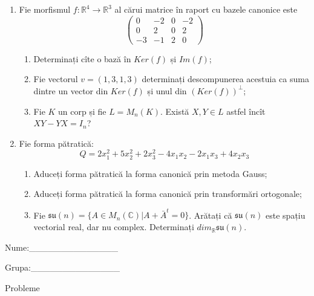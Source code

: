 \documentclass{article}
\begin{document}
\begin{enumerate}
 \item Fie morfismul $f:\mathbb{R}^4 \to \mathbb{R}^3$ al cărui matrice în raport cu bazele canonice este
$$\begin{pmatrix}
0&-2&0&-2\\
0&2&0&2\\
-3&-1&2&0
\end{pmatrix}$$

\begin{enumerate}
\item Determinați cîte o bază în $Ker(f)$ și $Im(f)$;
\item Fie vectorul $v=(1,3,1,3)$ determinați descompunerea acestuia ca suma dintre un vector din $Ker(f)$ și unul din $(Ker(f))^\perp$;
\item Fie $K$ un corp și fie $L=M_n(K)$. Există $X,Y \in L$ astfel încît $XY-YX=I_n$?  
\end{enumerate}
\item Fie forma pătratică:
$$Q= 2x_1^2+5x_2^2+2x_3^2-4x_1x_2-2x_1x_3+4x_2x_3$$

\begin{enumerate}
\item Aduceți forma pătratică la forma canonică prin metoda Gauss;
\item Aduceți forma pătratică la forma canonică prin transformări ortogonale;
\item Fie $\mathfrak{su}(n)=\{ A \in M_n(\mathbb{C}) | A+\bar{A}^t=0\}$. Arătați că $\mathfrak{su}(n)$ este spațiu vectorial real, dar nu complex.
Determinați $dim_{\mathbb{R}}\mathfrak{su}(n)$.
\end{enumerate}
\end{enumerate}
\newpage
\begin{flushright}
Nume:\_\_\_\_\_\_\_\_\_\_\_\_\_\_
 
 
Grupa:\_\_\_\_\_\_\_\_\_\_\_\_\_\_
\end{flushright}
\begin{center}
\vspace{2cm}
{\Large Probleme}
\vspace{2cm}
\end{center}
\end{document}

